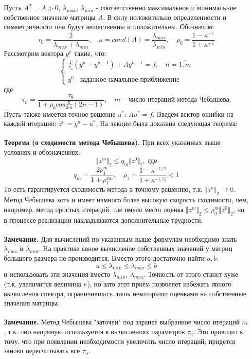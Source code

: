 \documentclass[a4paper,12pt,titlepage,final]{article}
\begin{document}
Пусть $A^T = A > 0$, $\lambda_{max}$, $\lambda_{min}$ - соответственно максимальное и минимальное собственное значение матрицы $A$. В силу положительно определенности и симметричности они будут вещественны и положительны. Обозначим:
$$\tau_0 = \frac{2}{\lambda_{max} + \lambda_{min}}, \quad
\kappa = cond(A) = \frac{\lambda_{max}}{\lambda_{min}}, \quad \rho_0 = \frac{1 - \kappa^{-1}}{1 + \kappa^{-1}}$$
Рассмотрим вектора $y^n$ такие, что:
$$\begin{cases}
 \frac{1}{\tau_n}(y^n - y^{n-1}) + Ay^{n-1} = f, \quad n = \overline{1, m} \\ \\
y^0 \: \text{- заданное начальное приближение}
\end{cases}$$
где
$$\tau_n = \frac{\tau_0}{1 + \rho_0cos\frac{\pi}{2m}(2n-1)}, \quad m - \text{число итераций метода Чебышева.}$$
Пусть также имеется точное решение $u^*$: $Au^* = f$. Введём вектор ошибки на каждой итерации: $z^n = y^n - u^*$. На лекции была доказана следующая теорема: \\ \\
\textbf{Теорема (о сходимости метода Чебышева).}  При всех указанных выше условиях и обозначениях:
$$\Vert z^m \Vert_2 \leq q_m \Vert z^0 \Vert_2, \text{ где}$$
$$q_m = \frac{2\rho_1^m}{1 + \rho_1^{2m}}, \quad \rho_1 = \frac{1 - \kappa^{-1/2}}{1 + \kappa^{-1/2}} < 1$$
То есть гарантируется сходимость метода к точному решению, т.к. $\Vert z^n \Vert_2 \to 0$. Метод Чебышева хоть и имеет намного более высокую скорость сходимости, чем, например, метод простых итераций, где имело место оценка $\Vert z^m \Vert_2 \leq \rho_0^m \Vert z^0 \Vert_2$, но в процессе реализации накладываются дополнительные трудности.\\\\
\textbf{Замечание.} Для вычислений по указанным выше формулам необходимо знать $\lambda_{max}$ и $\lambda_{min}$. На практике явное вычисление собственных значений у матриц большого размера не производится. Вместо этого достаточно найти $a, b:$ 
$$a \leq \lambda_{min} \leq \lambda_{max} \leq b$$
и использовать эти значения вместо $\lambda_{min},\: \lambda_{max}$. Точность от этого станет хуже (т.к. увеличится величина $\kappa$), но зато этот приём позволяет избежать явного вычисления спектра, ограничившись лишь некоторыми оценками на собственные значения матрицы.\\\\
\textbf{Замечание.} Метод Чебышева "заточен" \; под заранее выбранное число итераций $m$, т.к. оно напрямую используется в вычислениях параметров $\tau_n$. Это приводит к тому, что при появлении необходимости увеличить число итераций, придется заново пересчитывать все $\tau_n$. \\\\
\end{document}
